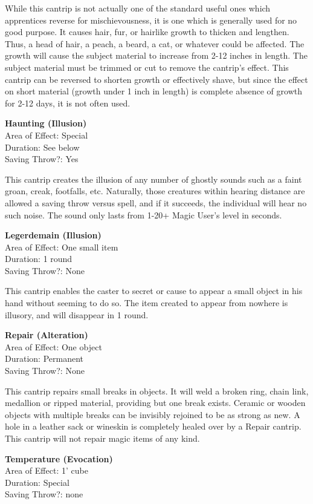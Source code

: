 \documentclass[letterpaper,sansserif,tightsqueeze]{rpg-module}
\begin{document}
While this cantrip is not actually one of the standard useful ones which apprentices reverse for mischievousness, it is one which is generally used for no good purpose. It causes hair, fur, or hairlike growth to thicken and lengthen. Thus, a head of hair, a peach, a beard, a cat, or whatever could be affected. The growth will cause the subject material to increase from 2-12 inches in length. The subject material must be trimmed or cut to remove the cantrip’s effect. This cantrip can be reversed to shorten growth or effectively shave, but since the effect on short material (growth under 1 inch in length) is complete absence of growth for 2-12 days, it is not often used.
	
\textbf{Haunting (Illusion)}\\
Area of Effect: Special\\
Duration: See below\\
Saving Throw?: Yes

This cantrip creates the illusion of any number of ghostly sounds such as a faint groan, creak, footfalls, etc. Naturally, those creatures within hearing distance are allowed a saving throw versus spell, and if it succeeds, the individual will hear no such noise. The sound only lasts from 1-20+ Magic User’s level in seconds.

\textbf{Legerdemain (Illusion)}\\
Area of Effect: One small item\\
Duration: 1 round\\
Saving Throw?: None
	
This cantrip enables the caster to secret or cause to appear a small object in his hand without seeming to do so. The item created to appear from nowhere is illusory, and will disappear in 1 round.
	
\textbf{Repair (Alteration)}\\
Area of Effect: One object\\
Duration: Permanent\\
Saving Throw?: None
	
This cantrip repairs small breaks in objects. It will weld a broken ring, chain link, medallion or ripped material, providing but one break exists. Ceramic or wooden objects with multiple breaks can be invisibly rejoined to be as strong as new. A hole in a leather sack or wineskin is completely healed over by a Repair cantrip. This cantrip will not repair magic items of any kind.
	
\textbf{Temperature (Evocation)}\\
Area of Effect: 1' cube\\
Duration: Special\\
Saving Throw?: none
	
\end{document}
